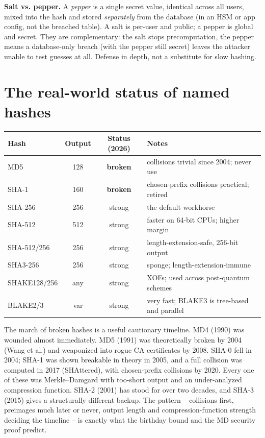 \begin{focusbox}
\textbf{Salt vs. pepper.} A \emph{pepper} is a single secret value, identical across all users, mixed into the hash and stored \emph{separately} from the database (in an HSM or app config, not the breached table). A salt is per-user and public; a pepper is global and secret. They are complementary: the salt stops precomputation, the pepper means a database-only breach (with the pepper still secret) leaves the attacker unable to test guesses at all. Defense in depth, not a substitute for slow hashing.
\end{focusbox}

\section{The real-world status of named hashes}
\label{ch14:realworld}

\begin{center}
\begin{tabular}{lccl}
\toprule
Hash & Output & Status (2026) & Notes \\
\midrule
MD5     & 128 & \textbf{broken} & collisions trivial since 2004; never use \\
SHA-1   & 160 & \textbf{broken} & chosen-prefix collisions practical; retired \\
SHA-256 & 256 & strong          & the default workhorse \\
SHA-512 & 512 & strong          & faster on 64-bit CPUs; higher margin \\
SHA-512/256 & 256 & strong      & length-extension-safe, 256-bit output \\
SHA3-256& 256 & strong          & sponge; length-extension-immune \\
SHAKE128/256 & any & strong     & XOFs; used across post-quantum schemes \\
BLAKE2/3& var & strong          & very fast; BLAKE3 is tree-based and parallel \\
\bottomrule
\end{tabular}
\end{center}

\begin{historybox}
The march of broken hashes is a useful cautionary timeline. MD4 (1990) was wounded almost immediately. MD5 (1991) was theoretically broken by 2004 (Wang et al.) and weaponized into rogue CA certificates by 2008. SHA-0 fell in 2004; SHA-1 was shown breakable in theory in 2005, and a full collision was computed in 2017 (SHAttered), with chosen-prefix collisions by 2020. Every one of these was Merkle--Damgard with too-short output and an under-analyzed compression function. SHA-2 (2001) has stood for over two decades, and SHA-3 (2015) gives a structurally different backup. The pattern -- collisions first, preimages much later or never, output length and compression-function strength deciding the timeline -- is exactly what the birthday bound and the MD security proof predict.
\end{historybox}

